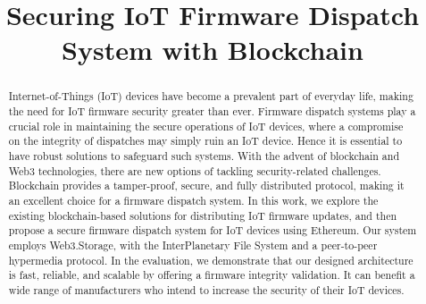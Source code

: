\documentclass[conference]{IEEEtran}
\begin{document}
\title{Securing IoT Firmware Dispatch System with Blockchain
}

\author{
}

\maketitle

\begin{abstract}
Internet-of-Things (IoT) devices have become a prevalent part of everyday life, making the need for IoT firmware security greater than ever. Firmware dispatch systems play a crucial role in maintaining the secure operations of IoT devices, where a compromise on the integrity of dispatches may simply ruin an IoT device. Hence it is essential to have robust solutions to safeguard such systems. With the advent of blockchain and Web3 technologies, there are new options of tackling security-related challenges. Blockchain provides a tamper-proof, secure, and fully distributed protocol, making it an excellent choice for a firmware dispatch system. In this work, we explore the existing blockchain-based solutions for distributing IoT firmware updates, and then propose a secure firmware dispatch system for IoT devices using Ethereum. Our system employs Web3.Storage, with the InterPlanetary File System and a peer-to-peer hypermedia protocol. In the evaluation, we demonstrate that our designed architecture is fast, reliable, and scalable by offering a firmware integrity validation. It can benefit a wide range of manufacturers who intend to increase the security of their IoT devices.

\end{abstract}
\end{document}
